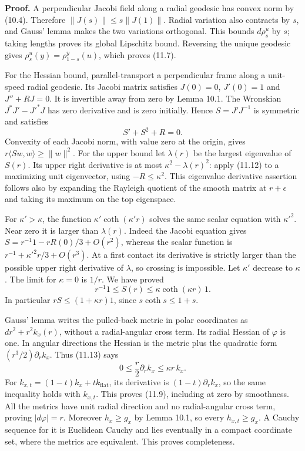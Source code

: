 \documentclass[
  11pt,
]{article}
\begin{document}
\textbf{Proof.} A perpendicular Jacobi field along a radial geodesic has
convex norm by (10.4). Therefore \(\|J(s)\|\leq s\|J(1)\|\). Radial
variation also contracts by \(s\), and Gauss' lemma makes the two
variations orthogonal. This bounds \(d\rho_s^u\) by \(s\); taking
lengths proves its global Lipschitz bound. Reversing the unique geodesic
gives \(\rho_s^u(y)=\rho_{1-s}^y(u)\), which proves (11.7).

For the Hessian bound, parallel-transport a perpendicular frame along a
unit-speed radial geodesic. Its Jacobi matrix satisfies \(J(0)=0\),
\(J'(0)=1\) and \(J''+RJ=0\). It is invertible away from zero by Lemma
10.1. The Wronskian \(J^*J'-J'^*J\) has zero derivative and is zero
initially. Hence \(S=J'J^{-1}\) is symmetric and satisfies \[
S'+S^2+R=0.
\tag{11.12}
\] Convexity of each Jacobi norm, with value zero at the origin, gives
\(r\langle S w,w\rangle\geq\|w\|^2\). For the upper bound let
\(\lambda(r)\) be the largest eigenvalue of \(S(r)\). Its upper right
derivative is at most \(\kappa^2-\lambda(r)^2\): apply (11.12) to a
maximizing unit eigenvector, using \(-R\leq\kappa^2\). This eigenvalue
derivative assertion follows also by expanding the Rayleigh quotient of
the smooth matrix at \(r+\epsilon\) and taking its maximum on the top
eigenspace.

For \(\kappa'>\kappa\), the function \(\kappa'\coth(\kappa'r)\) solves
the same scalar equation with \(\kappa'^2\). Near zero it is larger than
\(\lambda(r)\). Indeed the Jacobi equation gives
\(S=r^{-1}1-rR(0)/3+O(r^2)\), whereas the scalar function is
\(r^{-1}+\kappa'^2r/3+O(r^3)\). At a first contact its derivative is
strictly larger than the possible upper right derivative of \(\lambda\),
so crossing is impossible. Let \(\kappa'\) decrease to \(\kappa\). The
limit for \(\kappa=0\) is \(1/r\). We have proved \[
r^{-1}1\leq S(r)
\leq\kappa\coth(\kappa r)\,1.
\tag{11.13}
\] In particular \(rS\leq(1+\kappa r)1\), since \(s\coth s\leq1+s\).

Gauss' lemma writes the pulled-back metric in polar coordinates as
\(dr^2+r^2k_x(r)\), without a radial-angular cross term. Its radial
Hessian of \(\varphi\) is one. In angular directions the Hessian is the
metric plus the quadratic form \((r^3/2)\partial_r k_x\). Thus (11.13)
says \[
0\leq\frac r2\partial_r k_x\leq\kappa r\,k_x.
\tag{11.14}
\] For \(k_{x,t}=(1-t)k_x+t k_{\mathrm{flat}}\), its derivative is
\((1-t)\partial_r k_x\), so the same inequality holds with \(k_{x,t}\).
This proves (11.9), including at zero by smoothness. All the metrics
have unit radial direction and no radial-angular cross term, proving
\(|d\varphi|=r\). Moreover \(h_x\geq g_x\) by Lemma 10.1, so every
\(h_{x,t}\geq g_x\). A Cauchy sequence for it is Euclidean Cauchy and
lies eventually in a compact coordinate set, where the metrics are
equivalent. This proves completeness.
\end{document}
